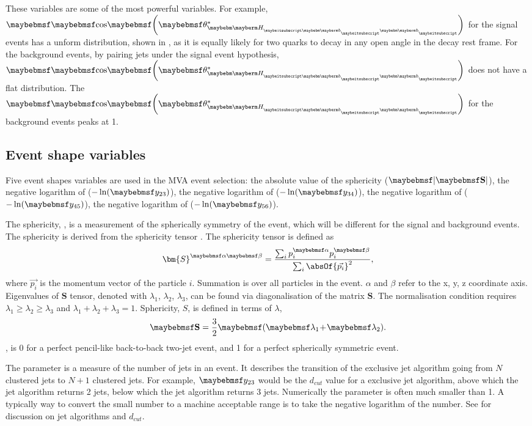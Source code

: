 These variables are some of the most powerful variables. For example, $\cosStar{\Hbb}$ for  the signal events has a unform distribution, shown in , as it is equally likely for two quarks to decay in any open angle in the \Hbb decay rest frame. For the background events, by pairing jets under the signal event hypothesis, $\cosStar{\Hbb}$ does not have a flat distribution. The  $\cosStar{\Hbb}$ for the background events peaks at 1.

\subsection{Event shape variables}

Five event shapes variables are used in the MVA event selection: the absolute value of the sphericity ($\abs{\sphericity}$), the negative logarithm of  ($-\ln(\y{23})$), the negative logarithm of  ($-\ln(\y{34})$), the negative logarithm of  ($-\ln(\y{45})$), the negative logarithm of  ($-\ln(\y{56})$).

The sphericity, \sphericity, is a measurement of the spherically symmetry of the event, which will be different for the signal and background events. The sphericity is  derived from the sphericity tensor \cite{PhysRevLett.35.1609}. The sphericity tensor is  defined as
\begin{equation}
{\bm{S}^{\alpha\beta}} = \frac{\sum_{i}p^{\alpha}_{i}p^{\beta}_{i}}{\sum_{i}\absOf{\vec{p_{i}}}^2},
\end{equation}
where $\vec{p_{i}}$ is the momentum vector of the particle $i$. Summation is over all particles in the event. $\alpha$ and $\beta$ refer to the x, y, z coordinate axis. Eigenvalues of $\bm{S}$  tensor, denoted with $\lambda_{1}$, $\lambda_{2}$, $\lambda_{3}$, can be found via diagonalisation of the matrix $\bm{S}$. The normalisation condition requires $\lambda_{1}\!\geqslant\! \lambda_{2} \! \geqslant \! \lambda_{3}$ and $ \lambda_{1} \! + \! \lambda_{2} \! + \! \lambda_{3} \! = \! 1 $. Sphericity, $S$, is defined in terms of $\lambda$,
\begin{equation}
\sphericity = \frac{3}{2}\parenths{\lambda_{1} \! + \! \lambda_{2}}.
\end{equation}
\sphericity, is 0 for a perfect pencil-like back-to-back two-jet event, and 1 for a perfect spherically symmetric event.

The \y{} parameter is a measure of the number of jets in an event.  It describes the transition of  the exclusive jet algorithm going from $N$ clustered jets to $N\!+\!1$ clustered jets. For example, $\y{23}$ would be the $d_{cut}$ value for a exclusive jet algorithm, above which the jet algorithm returns 2 jets, below which the jet algorithm returns 3 jets. Numerically the \y{} parameter is often much smaller than 1. A typically way to convert the small number to a machine acceptable range is to take the negative logarithm of the number. See  for discussion on jet algorithms and $d_{cut}$.

